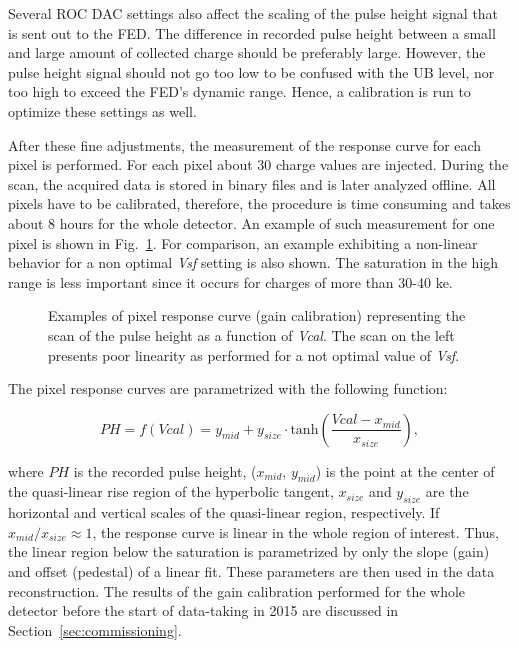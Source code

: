 Several ROC DAC settings also affect the scaling of the pulse height signal that is sent out to the FED. The difference in recorded pulse height between a small and large amount of collected charge should be preferably large.
However, the pulse height signal should not go too low to be confused with the UB level, nor too high to exceed the FED's dynamic range.
Hence, a calibration is run to optimize these settings as well.

After these fine adjustments, the measurement of the response curve for each pixel is performed. For each pixel about 30 charge values are injected. 
During the scan, the acquired data is stored in binary files and is later analyzed offline. All pixels have to be calibrated, therefore, the procedure is time consuming and takes about 8 hours for the whole detector.
An example of such measurement for one pixel is shown in Fig.~\ref{fig:GainCalib}. For comparison, an example exhibiting a non-linear behavior for a non optimal \textit{Vsf} setting is also shown.
The saturation in the high range is less important since it occurs for charges of more than 30-40 ke.

\begin{figure}[!htb]
 \begin{center}
 \end{center}
 \caption{Examples of pixel response curve (gain calibration) representing the scan of the pulse height as a function of \textit{Vcal}. The scan on the left presents poor linearity as performed for a not optimal value of \textit{Vsf}.}
 \label{fig:GainCalib}
\end{figure}

The pixel response curves are parametrized with the following function:

\begin{equation}
PH = f(Vcal) = y_{mid} + y_{size} \cdot \mathrm{tanh}\left( \frac{Vcal - x_{mid}}{x_{size}} \right),
\end{equation}

where $PH$ is the recorded pulse height,
($x_{mid}$, $y_{mid}$) is the point at the center of the quasi-linear rise region of the hyperbolic tangent,
$x_{size}$ and $y_{size}$ are the horizontal and vertical scales of the quasi-linear region, respectively.
If $x_{mid}/x_{size} \approx 1$, the response curve is linear in the whole region of interest.
Thus, the linear region below the saturation is
parametrized by only the slope (gain) and offset (pedestal) of a linear fit.
These parameters are then used in the data reconstruction. 
The results of the gain calibration performed for the whole detector before the start of data-taking in 2015 are discussed in Section~\ref{sec:commissioning}.

